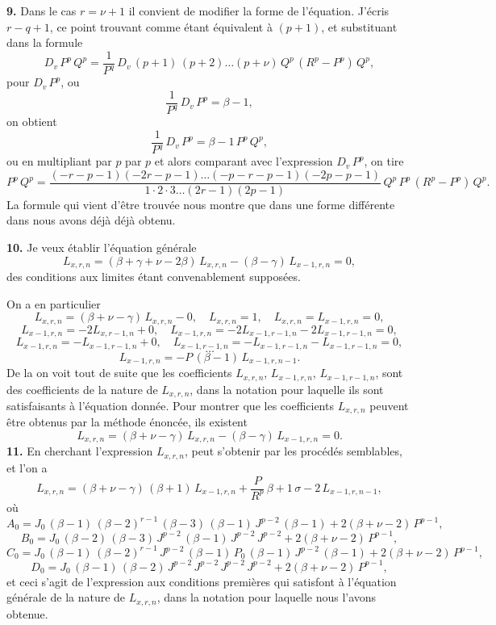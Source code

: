 \documentclass[11pt,a4paper]{book}
\begin{document}
\textbf{9.} Dans le cas $r=\nu+1$ il convient de modifier la forme de l'équation. J'écris $r-q+1$, ce point trouvant comme étant équivalent à $(p+1)$, et substituant dans la formule
\[
D_v\,P^p\,Q^p = \frac{1}{P^q}\,D_v\,(p+1)\,(p+2)\ldots(p+\nu)\,Q^p\,(R^p - P^p)\,Q^p,
\]
pour $D_v\,P^p$, ou
\[
\frac{1}{P^q}\,D_v\,P^p = \beta-1,
\]
on obtient
\[
\frac{1}{P^q}\,D_v\,P^p = \beta-1\,P^p\,Q^p,
\]
ou en multipliant par $p$ par $p$ et alors comparant avec l'expression $D_v\,P^p$, on tire
\[
P^p\,Q^p = \frac{(-r-p-1)(-2r-p-1)\ldots(-p-r-p-1)(-2p-p-1)}{1\cdot 2\cdot 3 \ldots (2r-1)(2p-1)} \,Q^p\,P^p\,(R^p - P^p)\,Q^p.
\]
La formule qui vient d'être trouvée nous montre que dans une forme différente dans nous avons déjà déjà obtenu.

\setcounter{page}{142}

\textbf{10.} Je veux établir l'équation générale
\[
L_{x,r,n} = (\beta + \gamma + \nu - 2\beta)\,L_{x,r,n} - (\beta - \gamma)\,L_{x-1,r,n} = 0,
\]
des conditions aux limites étant convenablement supposées.

On a en particulier
\[
L_{x,r,n} = (\beta + \nu - \gamma)\,L_{x,r,n} - 0,\quad L_{x,r,n} = 1,\quad L_{x,r,n} = L_{x-1,r,n} = 0,
\]
\[
L_{x-1,r,n} = -2L_{x,r-1,n} + 0,\quad L_{x-1,r,n} = -2L_{x-1,r-1,n} - 2L_{x-1,r-1,n} = 0,
\]
\[
L_{x-1,r,n} = -L_{x-1,r-1,n} + 0,\quad L_{x-1,r-1,n} = -L_{x-1,r-1,n} - L_{x-1,r-1,n} = 0,
\]
\[
\ldots
\]
\[
L_{x-1,r,n} = -P\,(\beta-1)\,L_{x-1,r,n-1}.
\]
De la on voit tout de suite que les coefficients $L_{x,r,n}$, $L_{x-1,r,n}$, $L_{x-1,r-1,n}$, sont des coefficients de la nature de $L_{x,r,n}$, dans la notation pour laquelle ils sont satisfaisants à l'équation donnée. Pour montrer que les coefficients $L_{x,r,n}$ peuvent être obtenus par la méthode énoncée, ils existent
\[
L_{x,r,n} = (\beta + \nu - \gamma)\,L_{x,r,n} - (\beta - \gamma)\,L_{x-1,r,n} = 0.
\]
\textbf{11.} En cherchant l'expression $L_{x,r,n}$, peut s'obtenir par les procédés semblables, et l'on a
\[
L_{x,r,n} = (\beta + \nu - \gamma)\,(\beta + 1)\,L_{x-1,r,n} + \frac{P}{R^p}\,\beta + 1\,\sigma - 2\,L_{x-1,r,n-1},
\]
où
\[
A_0 = J_0\,(\beta-1)\,(\beta-2)^{r-1}\,(\beta-3)\,(\beta-1)\,J^{p-2}\,(\beta-1) + 2(\beta+\nu-2)\,P^{p-1},
\]
\[
B_0 = J_0\,(\beta-2)\,(\beta-3)\,J^{p-2}\,(\beta-1)\,J^{p-2}\,J^{p-2} + 2(\beta+\nu-2)\,P^{p-1},
\]
\[
C_0 = J_0\,(\beta-1)\,(\beta-2)^{r-1}\,J^{p-2}\,(\beta-1)\,P_0\,(\beta-1)\,J^{p-2}\,(\beta-1) + 2(\beta+\nu-2)\,P^{p-1},
\]
\[
D_0 = J_0\,(\beta-1)\,(\beta-2)\,J^{p-2}\,J^{p-2}\,J^{p-2}\,J^{p-2} + 2(\beta+\nu-2)\,P^{p-1},
\]
et ceci s'agit de l'expression aux conditions premières qui satisfont à l'équation générale de la nature de $L_{x,r,n}$, dans la notation pour laquelle nous l'avons obtenue.
\end{document}
